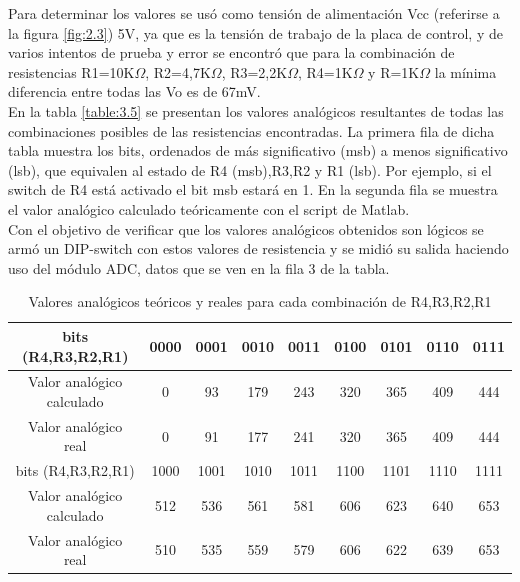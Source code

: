 Para determinar los valores se usó como tensión de alimentación Vcc (referirse a la figura \ref{fig:2.3}) 5V, ya que es la tensión de trabajo de la placa de control, y de varios intentos de prueba y error se encontró que para la combinación de resistencias R1=10K\(\Omega\), R2=4,7K\(\Omega\), R3=2,2K\(\Omega\), R4=1K\(\Omega\) y R=1K\(\Omega\) la mínima diferencia entre todas las Vo es de 67mV.\\
En la tabla \ref{table:3.5} se presentan los valores analógicos resultantes de todas las combinaciones posibles de las resistencias encontradas. La primera fila de dicha tabla muestra los bits, ordenados de más significativo (msb) a menos significativo (lsb), que equivalen al estado de R4 (msb),R3,R2 y R1 (lsb). Por ejemplo, si el switch de R4 está activado el bit msb estará en 1. En la segunda fila se muestra el valor analógico calculado teóricamente con el script de Matlab.\\
Con el objetivo de verificar que los valores analógicos obtenidos son lógicos se armó un DIP-switch con estos valores de resistencia y se midió su salida haciendo uso del módulo ADC, datos que se ven en la fila 3 de la tabla.

\begin{table}[!ht]
	\begin{center}
		\begin{tabular}{|c|c|c|c|c|c|c|c|c|}
			\hline
			\rowcolor{OODlightblue}
			bits (R4,R3,R2,R1) & 0000 & 0001 & 0010 & 0011 & 0100 & 0101 & 0110 & 0111  \\
			\hline
			Valor analógico calculado & 0 & 93 & 179 & 243 & 320 & 365 & 409 & 444 \\
			\hline
			Valor analógico real  & 0 & 91 & 177 & 241 & 320 & 365 & 409 & 444 \\
			\hline \hline
			\rowcolor{OODlightblue}
			bits (R4,R3,R2,R1) & 1000 & 1001 & 1010 & 1011 & 1100 & 1101 & 1110 & 1111  \\
			\hline
			Valor analógico calculado & 512  & 536  & 561  & 581  & 606  & 623  & 640  & 653  \\
			\hline
			Valor analógico real & 510  & 535  & 559  & 579  & 606  & 622  & 639  & 653 \\
			\hline
		\end{tabular}
	\end{center}
	\caption{Valores analógicos teóricos y reales para cada combinación de R4,R3,R2,R1}
	\label{table:\thetable}
\end{table}

\newpage
